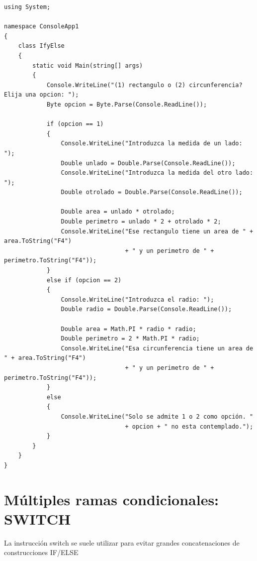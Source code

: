 \documentclass[spanish,12pt,a4paper,final,oneside]{book}
\begin{document}
\begin{lstlisting}[frame=single, caption=lenguaje C\#]
using System;

namespace ConsoleApp1
{
    class IfyElse
    {
        static void Main(string[] args)
        {
            Console.WriteLine("(1) rectangulo o (2) circunferencia? Elija una opcion: ");
            Byte opcion = Byte.Parse(Console.ReadLine());

            if (opcion == 1)
            {
                Console.WriteLine("Introduzca la medida de un lado: ");
                Double unlado = Double.Parse(Console.ReadLine());
                Console.WriteLine("Introduzca la medida del otro lado: ");
                Double otrolado = Double.Parse(Console.ReadLine());

                Double area = unlado * otrolado;
                Double perimetro = unlado * 2 + otrolado * 2;
                Console.WriteLine("Ese rectangulo tiene un area de " + area.ToString("F4")
                                  + " y un perimetro de " + perimetro.ToString("F4"));
            }
            else if (opcion == 2)
            {
                Console.WriteLine("Introduzca el radio: ");
                Double radio = Double.Parse(Console.ReadLine());

                Double area = Math.PI * radio * radio;
                Double perimetro = 2 * Math.PI * radio;
                Console.WriteLine("Esa circunferencia tiene un area de  " + area.ToString("F4")
                                  + " y un perimetro de " + perimetro.ToString("F4"));
            }
            else
            {
                Console.WriteLine("Solo se admite 1 o 2 como opción. "
                                  + opcion + " no esta contemplado.");
            }
        }
    }
}
\end{lstlisting}


\section{Múltiples ramas condicionales: SWITCH}
La instrucción switch se suele utilizar para evitar grandes concatenaciones de construcciones IF/ELSE
\end{document}
